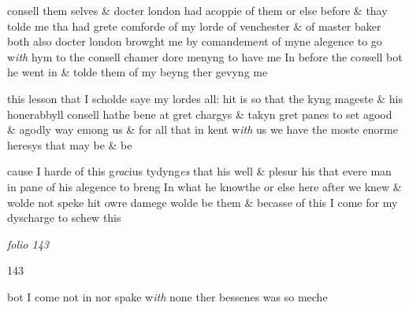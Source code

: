 \documentclass[12pt, a4paper]{book}
\begin{document}
 		
				\marginpar[\vspace{0.5cm}{\textcolor{Gray}{London n}}]{}
			
 		
				\marginpar[\vspace{0.5cm}{\textcolor{Gray}{my L. of wy.}}]{}
			
 		
				\marginpar[\vspace{0.5cm}{\textcolor{Gray}{Mr. Baker}}]{}
			
 		
		\ifthenelse{\isodd{\thepage}}
		{\reversemarginpar}
		{\normalmarginpar}
		consell them selves \& docter london had acoppie of them or else before \&
 			thay tolde me tha had grete comforde of my lorde of venchester \& of master baker both
		  also docter london browght me by comandeme\textit{n}t of myne alegence
		 to go w\textit{ith} hym to the consell chamer dore menyng to have me In before
		 the co\textit{n}sell bot he went in \& tolde them of my beyng ther gevyng me
		
 		
 			
				\marginpar[\vspace{0.5cm}{\textcolor{Gray}{n}}]{}
			
 			
		\ifthenelse{\isodd{\thepage}}
		{\reversemarginpar}
		{\normalmarginpar}
		this lesson that I scholde saye my lordes all: hit is so that the kyng
		  mageste \& his honerabbyll consell hathe bene at gret chargys \& takyn
		 gret panes to set agood \& agodly way emong us \& for all that in
		 kent w\textit{ith} us we have the moste enorme heresys that may be \& be
 		
 			
 				
				\marginpar[\vspace{0.5cm}{\textcolor{Gray}{n}}]{}
			
 				
		\ifthenelse{\isodd{\thepage}}
		{\reversemarginpar}
		{\normalmarginpar}
		
		  cause I harde of this g\textit{ra}cius tydyng\textit{es} that his well \& plesur his that evere
		 man in pane of his alegence to breng In what he knowthe or else
		 here after we knew \& wolde not speke hit owre damege wolde be them
		 \& becasse of this I come for my dyscharge to schew this

\dotfill
					

\textit{folio 143}


\begin{flushright}{\color{Mahogany}143}\end{flushright}

		\ifthenelse{\isodd{\thepage}}
		{\reversemarginpar}
		{\normalmarginpar}
		bot I come not in nor spake w\textit{ith} none ther bessenes was so meche
\end{document}
